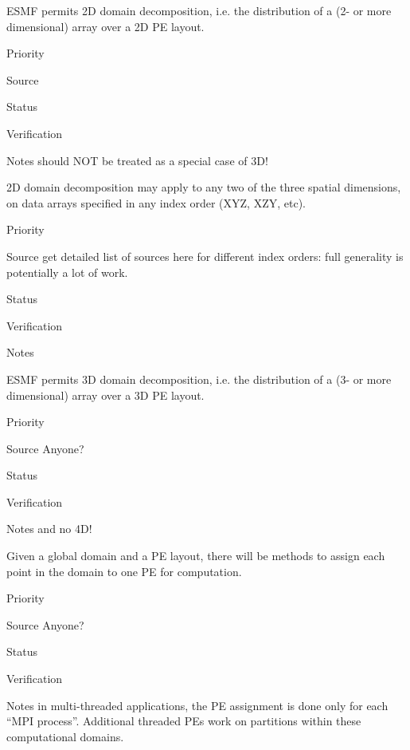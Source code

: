 ESMF permits 2D domain decomposition, i.e. the distribution of a
(2- or more dimensional) array over a 2D PE layout.

\begin{reqlist}
\item[Priority]
\item[Source]
\item[Status]
\item[Verification]
\item[Notes] should NOT be treated as a special case of 3D!
\end{reqlist}


2D domain decomposition may apply to any two of the three spatial
dimensions, on data arrays specified in any index order (XYZ, XZY,
etc).

\begin{reqlist}
\item[Priority]
\item[Source] get detailed list of sources here for different index
  orders: full generality is potentially a lot of work.
\item[Status]
\item[Verification]
\item[Notes]
\end{reqlist}


ESMF permits 3D domain decomposition, i.e. the distribution of a
(3- or more dimensional) array over a 3D PE layout.

\begin{reqlist}
\item[Priority]
\item[Source] Anyone?
\item[Status]
\item[Verification]
\item[Notes] and no 4D!
\end{reqlist}


Given a global domain and a PE layout, there will be methods to assign
each point in the domain to one PE for computation. 

\begin{reqlist}
\item[Priority]
\item[Source] Anyone?
\item[Status]
\item[Verification]
\item[Notes] in multi-threaded applications, the PE assignment is done
  only for each ``MPI process''. Additional threaded PEs work on
  partitions within these computational domains.
\end{reqlist}

